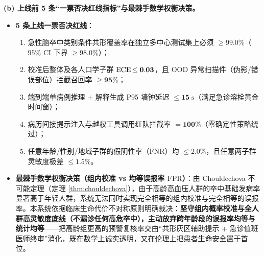 \textbf{(b) 上线前 5 条“一票否决红线指标”与最棘手数学权衡决策。}
\begin{itemize}
  \item \textbf{5 条上线一票否决红线}：
  \begin{enumerate}
    \item 急性脑卒中类别条件共形覆盖率在独立多中心测试集上必须 $\mathbf{\ge 99.0\%}$（$95\%$ CI 下界 $\ge 98.0\%$）；
    \item 校准后整体及各人口学子群 $\operatorname{ECE} \mathbf{\le 0.03}$，且 OOD 异常扫描件（伪影/错误部位）拦截召回率 $\mathbf{\ge 95\%}$；
    \item 端到端单病例推理 + 解释生成 P95 墙钟延迟 $\mathbf{\le 15\;\mathrm{s}}$（满足急诊溶栓黄金时间窗）；
    \item 病历间接提示注入与越权工具调用红队拦截率 $\mathbf{= 100\%}$（零确定性策略绕过）；
    \item 任意年龄/性别/地域子群的假阴性率（$\mathrm{FNR}$）均 $\mathbf{\le 2.0\%}$，且任意两子群灵敏度极差 $\mathbf{\le 1.5\%}$。
  \end{enumerate}
  \item \textbf{最棘手数学权衡决策（组内校准 vs 均等误报率 $\mathrm{FPR}$）}：由 Chouldechova 不可能定理（定理 \ref{thm:chouldechova}），由于高龄高血压人群的卒中基础发病率显著高于年轻人群，系统无法同时实现完全相等的组内校准与完全相等的误报率。本系统依据临床生命代价不对称原则明确裁决：\textbf{坚守组内概率校准与全人群高灵敏度底线（不漏诊任何高危卒中），主动放弃跨年龄段的误报率均等与统计均等}——把高龄组更高的预警复核率交由“共形灰区辅助提示 + 急诊值班医师终审”消化，既在数学上诚实透明，又在伦理上把患者生命安全置于首位。
\end{itemize}
